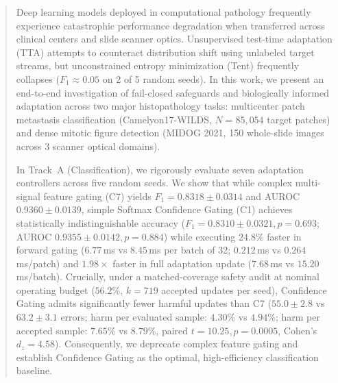 \documentclass[conference]{IEEEtran}
\begin{document}
\begin{abstract}
Deep learning models deployed in computational pathology frequently experience catastrophic performance degradation when transferred across clinical centers and slide scanner optics. Unsupervised test-time adaptation (TTA) attempts to counteract distribution shift using unlabeled target streams, but unconstrained entropy minimization (Tent) frequently collapses ($F_1 \approx 0.05$ on 2 of 5 random seeds). In this work, we present an end-to-end investigation of fail-closed safeguards and biologically informed adaptation across two major histopathology tasks: multicenter patch metastasis classification (Camelyon17-WILDS, $N=85{,}054$ target patches) and dense mitotic figure detection (MIDOG 2021, 150 whole-slide images across 3 scanner optical domains).

In Track~A (Classification), we rigorously evaluate seven adaptation controllers across five random seeds. We show that while complex multi-signal feature gating (C7) yields $F_1 = 0.8318 \pm 0.0314$ and AUROC $0.9360 \pm 0.0139$, simple Softmax Confidence Gating (C1) achieves statistically indistinguishable accuracy ($F_1 = 0.8310 \pm 0.0321, p=0.693$; AUROC $0.9355 \pm 0.0142, p=0.884$) while executing $24.8\%$ faster in forward gating ($6.77$\,ms vs $8.45$\,ms per batch of 32; $0.212$\,ms vs $0.264$\,ms/patch) and $1.98\times$ faster in full adaptation update ($7.68$\,ms vs $15.20$\,ms/batch). Crucially, under a matched-coverage safety audit at nominal operating budget ($56.2\%$, $k=719$ accepted updates per seed), Confidence Gating admits significantly fewer harmful updates than C7 ($55.0 \pm 2.8$ vs $63.2 \pm 3.1$ errors; harm per evaluated sample: $4.30\%$ vs $4.94\%$; harm per accepted sample: $7.65\%$ vs $8.79\%$, paired $t=10.25, p=0.0005$, Cohen's $d_z = 4.58$). Consequently, we deprecate complex feature gating and establish Confidence Gating as the optimal, high-efficiency classification baseline.


\end{abstract}
\end{document}
